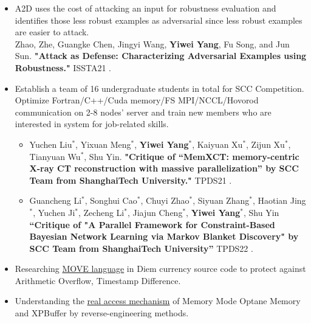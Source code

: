 \documentclass{resume}
\newcommand{\en}[1]{#1}
\newcommand{\zh}[1]{}
\begin{document}
\en{}
\zh{\datedsubsection{\textbf{\href{http://s3l.shanghaitech.edu.cn/}{上海科技大学系统}\href{https://toast-lab.gitee.io/}{实验室}}}{2019/07 -- 2021/06}}
\en{}
\zh{\role{本科生科研}{实习}}
\begin{itemize}
      \item \small{ \en{A2D uses the cost of attacking an input for robustness evaluation and identifies those less robust examples as adversarial since less robust examples are easier to attack.}
      \zh{A2D使用攻击输入的成本来进行鲁棒性评估，并将那些鲁棒性较差的例子确定为对抗性，因为鲁棒性较差的例子更容易被攻击。}}\\
      Zhao, Zhe, Guangke Chen, Jingyi Wang, \textbf{Yiwei Yang}, Fu Song, and Jun Sun. \textbf{"Attack as Defense: Characterizing Adversarial Examples using Robustness."} ISSTA21  .
            
      \item \small{\en{Establish a team of 16 undergraduate students in total for SCC Competition. Optimize Fortran/C++/Cuda memory/FS MPI/NCCL/Hovorod communication on 2-8 nodes' server and train new members who are interested in system for job-related skills.}\zh{建立一支由16名本科生组成的队伍参加SCC竞赛。在2-8个节点的服务器上优化Fortran/C++/Cuda内存/FS MPI/NCCL/Hovorod通信，并培训对系统感兴趣的新成员，以获得与工作有关的技能。}} \begin{itemize}
            \item Yuchen Liu$^{*}$, Yixuan Meng$^{*}$, \textbf{Yiwei Yang}$^{*}$, Kaiyuan Xu$^{*}$, Zijun Xu$^{*}$, Tianyuan Wu$^{*}$, Shu Yin. \textbf{"Critique of “MemXCT: memory-centric X-ray CT reconstruction with massive parallelization” by SCC Team from ShanghaiTech University."} TPDS21 .
            \item Guancheng Li$^{*}$, Songhui Cao$^{*}$, Chuyi Zhao$^{*}$, Siyuan Zhang$^{*}$, Haotian Jing$^{*}$, Yuchen Ji$^{*}$, Zecheng Li$^{*}$, Jiajun Cheng$^{*}$, \textbf{Yiwei Yang}$^{*}$, Shu Yin \textbf{“Critique of "A Parallel Framework for Constraint-Based Bayesian Network Learning via Markov Blanket Discovery" by SCC Team from ShanghaiTech University”} TPDS22 .
            \end{itemize}
      \item \en{Researching \href{https://github.com/LEAFERx/movable}{MOVE language} in Diem currency source code to protect against Arithmetic Overflow, Timestamp Difference.}
            \zh{研究Diem源码中的\href{https://github.com/LEAFERx/movable}{MOVE language}，提高抵御时间戳攻击、整数溢出等的安全性。}
      \item \en{Understanding the \href{https://github.com/victoryang00/pmemable}{real access mechanism} of Memory Mode Optane Memory and XPBuffer by reverse-engineering methods.}
            \zh{通过逆向工程的相关手段去理解在memory mode 下傲腾内存以及XPBuffer的\href{https://github.com/victoryang00/pmemable}{内存置换算法逻辑}。}
\end{itemize}
\end{document}
